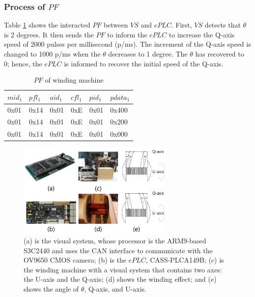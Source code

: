 \documentclass[journal,UTF8]{IEEEtran}
\begin{document}
	\subsubsection{Process of $PF$}
	Table \ref{table:PFofWinding} shows the interacted $PF$ between $VS$ and $ePLC$. First, $VS$ detects that $\theta$ is 2 degrees. It then sends the $PF$ to inform the $ePLC$ to increase the Q-axis speed of 2000 pulses per millisecond (p/ms). The increment of the Q-axis speed is changed to 1000 p/ms when the $\theta$ decreases to 1 degree. The $\theta$ has recovered to 0; hence, the $ePLC$ is informed to recover the initial speed of the Q-axis.  
	\begin{table}
		\scriptsize \caption{$PF$ of winding machine}
		\label{table:PFofWinding}
		\begin{center}
			\renewcommand{\arraystretch}{1.4}
			\setlength\tabcolsep{3pt}
			\begin{tabular}{|p{1.2cm}|p{1.2cm}|p{1.2cm}|p{1.2cm}|p{1.2cm}|p{1cm}|}
				\hline
				$mid_1$  & $pfl_1$ &$aid_1$ & $cfl_1$  & $pid_1$  &$pdata_1$   \\
				\hline
				0x01    & 0x14  &0x01  &0xE     &0x01   &0x400   \\
				\hline
				0x01    & 0x14  &0x01  &0xE     &0x01   &0x200   \\
				\hline
				0x01    & 0x14  &0x01  &0xE     &0x01   &0x000   \\
				\hline
			\end{tabular}
		\end{center}
	\end{table}
	\begin{figure}
		\centering
		\includegraphics[width=3in]{fig/Winding.pdf}
		\caption{(a) is the visual system, whose processor is the ARM9-based S3C2440 and uses the CAN interface to communicate with the OV9650 CMOS camera; (b) is the $ePLC$, CASS-PLCA149B; (c) is the winding machine with a visual system that contains two axes: the U-axis and the Q-axis; (d) shows the winding effect; and (e) shows the angle of $\theta$, Q-axis, and U-axis.
		}
		\label{fig:Winding}
	\end{figure}
	
\end{document}
